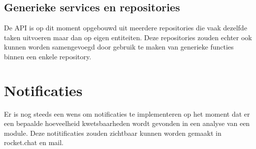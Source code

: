 \subsection{Generieke services en repositories}\label{subsec:generieke-services-en-repositories}
De API is op dit moment opgebouwd uit meerdere repositories die vaak dezelfde taken uitvoeren maar dan op eigen entiteiten. Deze repositories zouden echter ook kunnen worden samengevoegd door gebruik te maken van generieke functies binnen een enkele repository.

\section{Notificaties}\label{sec:notificaties}
Er is nog steeds een wens om notificaties te implementeren op het moment dat er een bepaalde hoeveelheid kwetsbaarheden wordt gevonden in een analyse van een module. Deze notitificaties zouden zichtbaar kunnen worden gemaakt in rocket.chat en mail.


